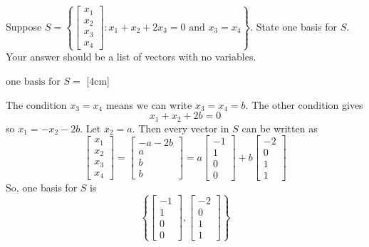 \documentclass[11pt]{article}
\begin{document}
\begin{prob}
Suppose $S = \left\{ \begin{bmatrix} x_1 \\ x_2 \\ x_3 \\ x_4 \end{bmatrix} : x_1 + x_2 + 2x_3 = 0 \text{ and } x_3 = x_4 \right\}$.
State one basis for $S$. Your answer should be a list of vectors with no variables.

$\text{one basis for } S = $ [4cm]

\begin{solution}
The condition $x_3=x_4$ means we can write $x_3=x_4=b$. The other condition gives
\[
x_1+x_2+2b=0
\]
so $x_1=-x_2-2b$. Let $x_2=a$. Then every vector in $S$ can be written as
\[
\begin{bmatrix}
x_1\\x_2\\x_3\\x_4
\end{bmatrix}
=
\begin{bmatrix}
-a-2b\\a\\b\\b
\end{bmatrix}
=
a\begin{bmatrix}-1\\1\\0\\0\end{bmatrix}
+b\begin{bmatrix}-2\\0\\1\\1\end{bmatrix}
\]
So, one basis for $S$ is
\[
\left\{
\begin{bmatrix}-1\\1\\0\\0\end{bmatrix},
\begin{bmatrix}-2\\0\\1\\1\end{bmatrix}
\right\}
\]


\end{solution}
\end{prob}
\end{document}

